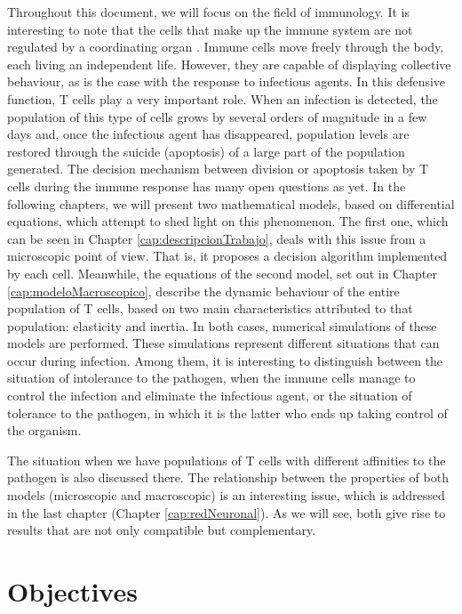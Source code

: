 Throughout this document, we will focus on the field of immunology. It is interesting to note that the cells that make up the immune system are not regulated by a coordinating organ \citep{arias2016emergent}. Immune cells move freely through the body, each living an independent life. However, they are capable of displaying collective behaviour, as is the case with the response to infectious agents. In this defensive function, T cells play a very important role. When an infection is detected, the population of this type of cells grows by several orders of magnitude in a few days and, once the infectious agent has disappeared, population levels are restored through the suicide (apoptosis) of a large part of the population generated. The decision mechanism between division or apoptosis taken by T cells during the immune response has many open questions as yet. In the following chapters, we will present two mathematical models, based on differential equations, which attempt to shed light on this phenomenon. The first one, which can be seen in Chapter \ref{cap:descripcionTrabajo}, deals with this issue from a microscopic point of view. That is, it proposes a decision algorithm implemented by each cell. Meanwhile, the equations of the second model, set out in Chapter \ref{cap:modeloMacroscopico}, describe the dynamic behaviour of the entire population of T cells, based on two main characteristics attributed to that population: elasticity and inertia. In both cases, numerical simulations of these models are performed. These simulations represent different situations that can occur during infection. Among them, it is interesting to distinguish between the situation of intolerance to the pathogen, when the immune cells manage to control the infection and eliminate the infectious agent, or the situation of tolerance to the pathogen, in which it is the latter who ends up taking control of the organism. 

The situation when we have populations of T cells with different affinities to the pathogen is also discussed there. The relationship between the properties of both models (microscopic and macroscopic) is an interesting issue, which is addressed in the last chapter (Chapter \ref{cap:redNeuronal}). As we will see, both give rise to results that are not only compatible but complementary. 



\section{Objectives}


